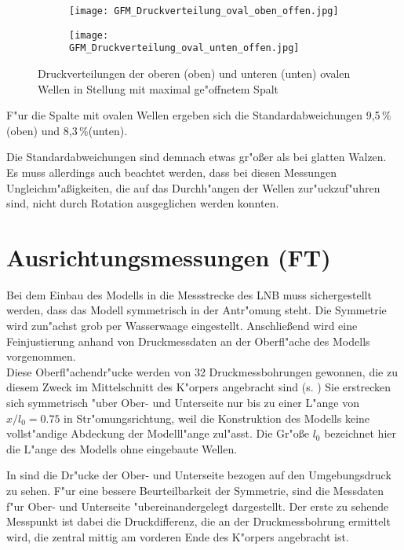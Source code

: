 \begin{figure}[h]
	\centering
	\begin{subfigure}[c]{0.85\textwidth}		
		\texttt{[image: GFM\_Druckverteilung\_oval\_oben\_offen.jpg]}
	\end{subfigure}
	\begin{subfigure}[c]{0.85\textwidth}
		\texttt{[image: GFM\_Druckverteilung\_oval\_unten\_offen.jpg]}
	\end{subfigure}
	\caption{Druckverteilungen der oberen (oben) und unteren (unten) ovalen Wellen in Stellung mit maximal ge"offnetem Spalt}
	\label{fig:Druckverteilung_oval_offen}
\end{figure}

F"ur die Spalte mit ovalen Wellen ergeben sich die Standardabweichungen 9,5\,\% (oben) und 8,3\,\%(unten).

Die Standardabweichungen sind demnach etwas gr"o\ss{}er als bei glatten Walzen. Es muss allerdings auch beachtet werden, dass bei diesen Messungen Ungleichm"a\ss{}igkeiten, die auf das Durchh"angen der Wellen zur"uckzuf"uhren sind, nicht durch Rotation ausgeglichen werden konnten.


\section{Ausrichtungsmessungen (FT)}
\label{s:Vorueberlegungen}
Bei dem Einbau des Modells in die Messstrecke des LNB muss sichergestellt werden, dass das Modell symmetrisch in der Antr"omung steht. Die Symmetrie wird zun"achst grob per Wasserwaage eingestellt. Anschlie\ss{}end wird eine Feinjustierung anhand von Druckmessdaten an der Oberfl"ache des Modells vorgenommen.\\
Diese Oberfl"achendr"ucke werden von 32 Druckmessbohrungen gewonnen, die zu diesem Zweck im Mittelschnitt des K"orpers angebracht sind (s. )
Sie erstrecken sich symmetrisch "uber Ober- und Unterseite nur bis zu einer L"ange von $x/l_{0} = 0.75$ in Str"omungsrichtung, weil die Konstruktion des Modells keine vollst"andige Abdeckung der Modelll"ange zul"asst.
Die Gr"o\ss{}e $l_0$ bezeichnet hier die L"ange des Modells ohne eingebaute Wellen.

In  sind die Dr"ucke der Ober- und Unterseite bezogen auf den Umgebungsdruck zu sehen.
F"ur eine bessere Beurteilbarkeit der Symmetrie, sind die Messdaten f"ur Ober- und Unterseite "ubereinandergelegt dargestellt. Der erste zu sehende Messpunkt ist dabei die Druckdifferenz, die an der Druckmessbohrung ermittelt wird, die zentral mittig am vorderen Ende des K"orpers angebracht ist.


